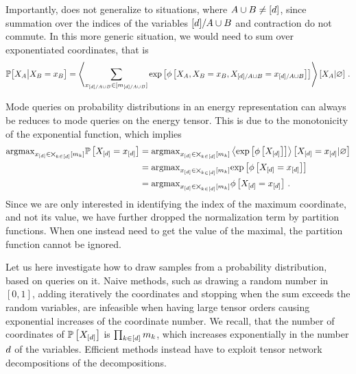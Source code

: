 Importantly,  does not generalize to situations, where $A\cup B\neq[d]$, since summation over the indices of the variables $[d]/A\cup B$ and contraction do not commute.
In this more generic situation, we would need to sum over exponentiated coordinates, that is
\begin{align*}
    \mathbb{P}\big[X_{A}\big|X_{B}=x_{B}\big]
    = \left\langle 
        \sum_{x_{[d]/A\cup B}\in[m_{[d]/A\cup B}]}
        \mathrm{exp}\left[\phi\left[X_{A},X_{B}=x_{B},X_{[d]/A\cup B}=x_{[d]/A\cup B}\right]\right]
    \right\rangle \left[ X_{A} | \varnothing \right] \, .
\end{align*}


Mode queries on probability distributions in an energy representation can always be reduces to mode queries on the energy tensor.
This is due to the monotonicity of the exponential function, which implies
\begin{align*}
    \mathrm{argmax}_{x_{[d]}\in\bigtimes_{k\in[d]}[m_{k}]} \mathbb{P}\left[X_{[d]}=x_{[d]}\right]
    &=\mathrm{argmax}_{x_{[d]}\in\bigtimes_{k\in[d]}[m_{k}]} \left\langle \mathrm{exp}\left[\phi\left[X_{[d]}\right]\right]\right\rangle \left[ X_{[d]}=x_{[d]} | \varnothing \right] \\
    &=\mathrm{argmax}_{x_{[d]}\in\bigtimes_{k\in[d]}[m_{k}]} \mathrm{exp}\left[\phi\left[X_{[d]}=x_{[d]}\right]\right] \\
    &=\mathrm{argmax}_{x_{[d]}\in\bigtimes_{k\in[d]}[m_{k}]} \phi\left[X_{[d]}=x_{[d]}\right] \, .
\end{align*}
Since we are only interested in identifying the index of the maximum coordinate, and not its value, we have further dropped the normalization term by partition functions.
When one instead need to get the value of the maximal, the partition function cannot be ignored.


Let us here investigate how to draw samples from a probability distribution, based on queries on it.
Naive methods, such as drawing a random number in $[0,1]$, adding iteratively the coordinates and stopping when the sum exceeds the random variables, are infeasible when having large tensor orders causing exponential increases of the coordinate number.
We recall, that the number of coordinates of $\mathbb{P}\left[X_{[d]}\right]$ is $\prod_{k\in[d]}m_{k}$, which increases exponentially in the number $d$ of the variables.
Efficient methods instead have to exploit tensor network decompositions of the decompositions.

